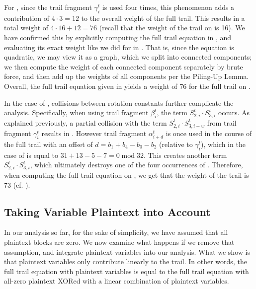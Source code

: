 For \MORUS[1280], since the trail fragment $\gamma^t_i$ is used four times, this phenomenon adds a contribution of $4 \cdot 3 = 12$ to the overall weight of the full trail. This results in a total weight of $4 \cdot 16 + 12 = 76$ (recall that the weight of the trail on \MiniMORUS[1280] is 16). We have confirmed this by explicitly computing the full trail equation in , and evaluating its exact weight like we did for \MiniMORUS in . That is, since the equation is quadratic, we may view it as a graph, which we split into connected components; we then compute the weight of each connected component separately by brute force, and then add up the weights of all components per the Piling-Up Lemma. Overall, the full trail equation given in  yields a weight of 76 for the full trail on \MORUS[1280].

In the case of \MORUS[640], collisions between rotation constants further complicate the analysis. Specifically, when using trail fragment $\beta^t_i$, the term $S^t_{2,i} \cdot S^t_{3,i}$ occurs. As explained previously, a partial collision with the term $S^t_{2,i} \cdot S^t_{3,i-w}$ from trail fragment $\gamma^t_i$ results in . However trail fragment $\alpha^t_{i+d}$ is once used in the course of the full trail with an offset of $d = b_1+b_4-b_0-b_2$ (relative to $\gamma^t_i$), which in the case of \MORUS[640] is equal to $31+13-5-7 = 0 \;\text{mod}\; 32$. This creates another term $S^t_{2,i} \cdot S^t_{3,i}$, which ultimately destroys one of the four occurrences of . Therefore, when computing the full trail equation on \MORUS[640], we get that the weight of the trail is 73 (cf. ).


\subsection{Taking Variable Plaintext into Account}
\label{subsec:variable}

In our analysis so far, for the sake of simplicity, we have assumed that all plaintext blocks are zero. We now examine what happens if we remove that assumption, and integrate plaintext variables into our analysis. What we show is that plaintext variables only contribute linearly to the trail. In other words, the full trail equation with plaintext variables is equal to the full trail equation with all-zero plaintext XORed with a linear combination of plaintext variables.

